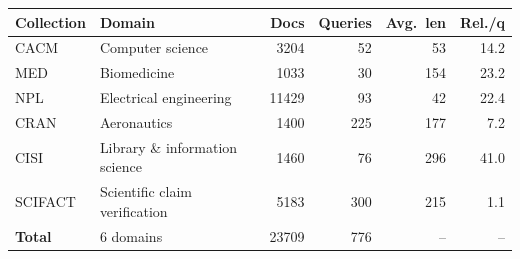 \begin{tabular}{llrrrr}
\toprule
Collection & Domain & Docs & Queries & Avg.\ len & Rel./q \\
\midrule
CACM & Computer science & 3204 & 52 & 53 & 14.2 \\
MED & Biomedicine & 1033 & 30 & 154 & 23.2 \\
NPL & Electrical engineering & 11429 & 93 & 42 & 22.4 \\
CRAN & Aeronautics & 1400 & 225 & 177 & 7.2 \\
CISI & Library \& information science & 1460 & 76 & 296 & 41.0 \\
SCIFACT & Scientific claim verification & 5183 & 300 & 215 & 1.1 \\
\midrule
\textbf{Total} & 6 domains & 23709 & 776 & -- & -- \\
\bottomrule
\end{tabular}
